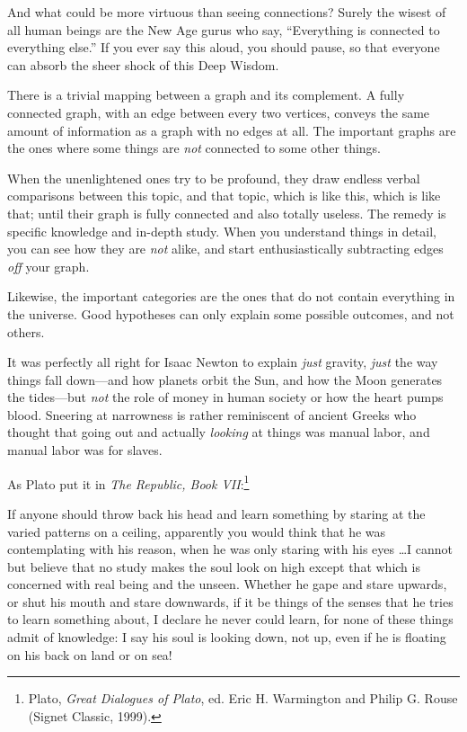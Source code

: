 {
 And what could be more virtuous than seeing connections? Surely
the wisest of all human beings are the New Age gurus who say,
``Everything is connected to everything
else.'' If you ever say this aloud, you should pause,
so that everyone can absorb the sheer shock of this Deep Wisdom.}

{
 There is a trivial mapping between a graph and its complement. A
fully connected graph, with an edge between every two vertices, conveys
the same amount of information as a graph with no edges at all. The
important graphs are the ones where some things are \textit{not}
connected to some other things.}

{
 When the unenlightened ones try to be profound, they draw endless
verbal comparisons between this topic, and that topic, which is like
this, which is like that; until their graph is fully connected and also
totally useless. The remedy is specific knowledge and in-depth study.
When you understand things in detail, you can see how they are
\textit{not} alike, and start enthusiastically subtracting edges
\textit{off} your graph.}

{
 Likewise, the important categories are the ones that do not
contain everything in the universe. Good hypotheses can only explain
some possible outcomes, and not others.}

{
 It was perfectly all right for Isaac Newton to explain
\textit{just} gravity, \textit{just} the way things fall down---and how
planets orbit the Sun, and how the Moon generates the tides---but
\textit{not} the role of money in human society or how the heart pumps
blood. Sneering at narrowness is rather reminiscent of ancient Greeks
who thought that going out and actually \textit{looking} at things was
manual labor, and manual labor was for slaves.}

{
 As Plato put it in \textit{The Republic, Book
VII}:\footnote{Plato, \textit{Great Dialogues of Plato}, ed. Eric H.
Warmington and Philip G. Rouse (Signet Classic, 1999).}}

{
 If anyone should throw back his head and learn something by
staring at the varied patterns on a ceiling, apparently you would think
that he was contemplating with his reason, when he was only staring
with his eyes \ldots I cannot but believe that no study makes the soul
look on high except that which is concerned with real being and the
unseen. Whether he gape and stare upwards, or shut his mouth and stare
downwards, if it be things of the senses that he tries to learn
something about, I declare he never could learn, for none of these
things admit of knowledge: I say his soul is looking down, not up, even
if he is floating on his back on land or on sea!}

